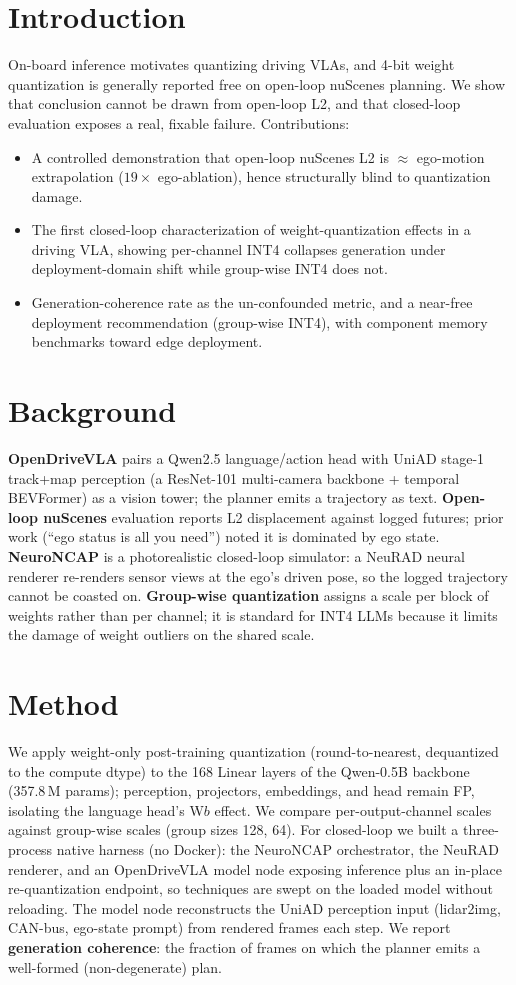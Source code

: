 \documentclass[conference]{IEEEtran}
\begin{document}
\section{Introduction}
On-board inference motivates quantizing driving VLAs, and 4-bit weight quantization is generally
reported free on open-loop nuScenes planning. We show that conclusion cannot be drawn from
open-loop L2, and that closed-loop evaluation exposes a real, fixable failure. Contributions:
\begin{itemize}
\item A controlled demonstration that open-loop nuScenes L2 is $\approx$ ego-motion extrapolation
($19\times$ ego-ablation), hence structurally blind to quantization damage.
\item The first closed-loop characterization of weight-quantization effects in a driving VLA,
showing per-channel INT4 collapses generation under deployment-domain shift while group-wise INT4
does not.
\item Generation-coherence rate as the un-confounded metric, and a near-free deployment
recommendation (group-wise INT4), with component memory benchmarks toward edge deployment.
\end{itemize}

\section{Background}
\textbf{OpenDriveVLA} pairs a Qwen2.5 language/action head with UniAD stage-1 track+map perception
(a ResNet-101 multi-camera backbone + temporal BEVFormer) as a vision tower; the planner emits a
trajectory as text. \textbf{Open-loop nuScenes} evaluation reports L2 displacement against logged
futures; prior work (``ego status is all you need'') noted it is dominated by ego state.
\textbf{NeuroNCAP} is a photorealistic closed-loop simulator: a NeuRAD neural renderer re-renders
sensor views at the ego's driven pose, so the logged trajectory cannot be coasted on.
\textbf{Group-wise quantization} assigns a scale per block of weights rather than per channel; it
is standard for INT4 LLMs because it limits the damage of weight outliers on the shared scale.

\section{Method}
We apply weight-only post-training quantization (round-to-nearest, dequantized to the compute
dtype) to the 168 Linear layers of the Qwen-0.5B backbone (357.8\,M params); perception,
projectors, embeddings, and head remain FP, isolating the language head's W$b$ effect. We compare
per-output-channel scales against group-wise scales (group sizes 128, 64). For closed-loop we built
a three-process native harness (no Docker): the NeuroNCAP orchestrator, the NeuRAD renderer, and an
OpenDriveVLA model node exposing inference plus an in-place re-quantization endpoint, so techniques
are swept on the loaded model without reloading. The model node reconstructs the UniAD perception
input (lidar2img, CAN-bus, ego-state prompt) from rendered frames each step. We report
\textbf{generation coherence}: the fraction of frames on which the planner emits a well-formed
(non-degenerate) plan.
\end{document}
